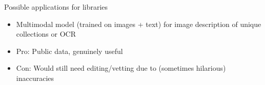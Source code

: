 \documentclass{beamer}
\begin{document}
\begin{frame}{Possible applications for libraries}
	\begin{itemize}
		\item Multimodal model (trained on images + text) for image description of unique collections or OCR
		\pause
		\item Pro: Public data, genuinely useful
		\pause
		\item Con: Would still need editing/vetting due to (sometimes hilarious) inaccuracies
		
	\end{itemize}
\end{frame}

\begin{frame}[plain]
\end{frame}

\begin{frame}[plain]
\end{frame}

\begin{frame}[plain]
\end{frame}
\end{document}
